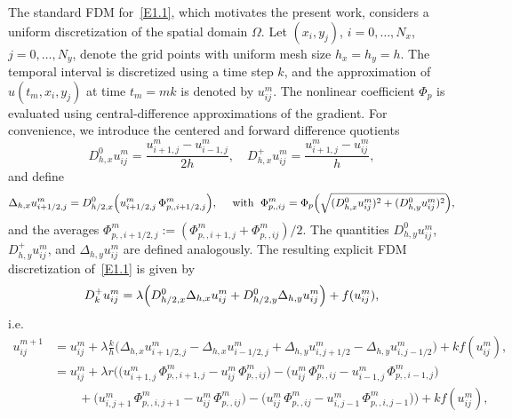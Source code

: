 \documentclass[final,12pt,3p]{elsarticle}
\theoremstyle{plain}
\theoremstyle{definition}
\theoremstyle{remark}
\begin{document}
The standard FDM for~\eqref{E1.1}, which motivates the present work, considers a uniform discretization of the spatial domain $\Omega$. 
Let $(x_i,y_j)$, $i=0,\ldots,N_x$, $j=0,\ldots,N_y$, denote the grid points with uniform mesh size $h_x = h_y = h$. 
The temporal interval is discretized using a time step $k$, and the approximation of $u(t_m, x_i, y_j)$ at time $t_m = m k$ is denoted by $u_{ij}^m$.
The nonlinear coefficient $\Phi_p$ is evaluated using central-difference approximations of the gradient. 
For convenience, we introduce the centered and forward difference quotients
\begin{equation*}
   D_{h,x}^0 u_{ij}^m  = \frac{u_{i+1,j}^m-u_{i-1,j}^m}{2h}, 
   \quad 
   D_{h,x}^+ u_{ij}^m = \frac{u_{i+1,j}^m-u_{ij}^m}{h},
\end{equation*}
and define
\begin{equation*}
\Delta_{h,x} u_{i+1/2,j}^m = D_{h/2,x}^0 \Bigl(u_{i+1/2,j}^m\, 
\Phi_{p,,i+1/2,j}^m
\Bigr), \quad \text{ with } \;\Phi_{p,,ij}^m = \Phi_p\Bigl(\sqrt{ (D_{h,x}^0 u_{ij}^m)^2 + (D_{h,y}^0 u_{ij}^m)^2}\Bigr),
\end{equation*}
and the averages $\Phi_{p,,i+1/2,j}^m:=(\Phi_{p,,i+1,j}^m+\Phi_{p,,ij}^m)/2$.
The quantities %
$D_{h,y}^0 u_{ij}^m$, $D_{h,y}^+ u_{ij}^m$, and $\Delta_{h,y}u_{ij}^m$ are defined analogously.
The resulting explicit FDM discretization of~\eqref{E1.1} is given by
\begin{equation*}
    D^+_k u_{ij}^m = \lambda \Bigl(D_{h/2,x}^0 \Delta_{h,x} u_{ij}^m + D_{h/2,y}^0 \Delta_{h,y} u_{ij}^m \Bigr)+ f(u_{ij}^m),
\end{equation*}
i.e.
\begin{equation}\label{E1.2}
\begin{split}
   u_{ij}^{m+1} &= u_{ij}^m + \lambda\frac{k}{h} \Big(
   \Delta_{h,x}u_{i+1/2,j}^m - \Delta_{h,x}u_{i-1/2,j}^m  + \Delta_{h,y}u_{i,j+1/2}^m - \Delta_{h,y} u_{i,j-1/2}^m \Big) + k f(u_{ij}^m),\\
   &= u_{ij}^m + \lambda r \Big(\bigl(u_{i+1,j}^m\,\Phi_{p,,i+1,j}^m- u_{ij}^m\,\Phi_{p,,ij}^m \bigr) 
    - \bigl(u_{ij}^m\, \Phi_{p,,ij}^m- u_{i-1,j}^m\,\Phi_{p,,i-1,j}^m \bigr)\\
    &\qquad+ \bigl(u_{i,j+1}^m\,\Phi_{p,,i,j+1}^m- u_{ij}^m\,\Phi_{p,,ij}^m \bigr)
    - \bigl(u_{ij}^m\, \Phi_{p,,ij}^m- u_{i,j-1}^m\,\Phi_{p,,i,j-1}^m \bigr) \Big) + k f(u_{ij}^m),
\end{split}
\end{equation}
\end{document}
